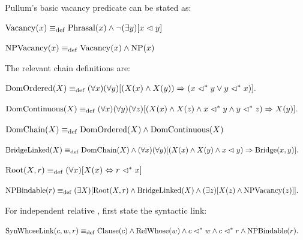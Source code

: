 \documentclass[11pt]{article}
\newcommand{\Vacancy}{\mathrm{Vacancy}}
\newcommand{\NPVac}{\mathrm{NPVacancy}}
\newcommand{\Bridge}{\mathrm{Bridge}}
\newcommand{\DomOrdered}{\mathrm{DomOrdered}}
\newcommand{\DomContinuous}{\mathrm{DomContinuous}}
\newcommand{\DomChain}{\mathrm{DomChain}}
\newcommand{\BridgeLinked}{\mathrm{BridgeLinked}}
\newcommand{\Root}{\mathrm{Root}}
\newcommand{\NPBindable}{\mathrm{NPBindable}}
\newcommand{\RelWhose}{\mathrm{RelWhose}}
\newcommand{\SynWhoseLink}{\mathrm{SynWhoseLink}}
\begin{document}
Pullum's basic vacancy predicate can be stated as:

\ea
$\Vacancy(x) \defas \Phrasal(x) \wedge \neg(\exists y)[x \imdom y]$\\
\z

\ea
$\NPVac(x) \defas \Vacancy(x) \wedge \NP(x)$\\
\z

The relevant chain definitions are:

\ea
$\begin{aligned}
\DomOrdered(X) \defas {} &
  (\forall x)(\forall y)[(X(x) \wedge X(y)) \Rightarrow
    (x \dm y \vee y \dm x)].
\end{aligned}$\\
\z

\ea
$\begin{aligned}
\DomContinuous(X) \defas {} &
  (\forall x)(\forall y)(\forall z)[(X(x) \wedge X(z) \wedge x \dm y
    \wedge y \dm z) \Rightarrow X(y)].
\end{aligned}$\\
\z

\ea
$\DomChain(X) \defas \DomOrdered(X) \wedge \DomContinuous(X)$\\
\z

\ea
$\begin{aligned}
\BridgeLinked(X) \defas {} & \DomChain(X) \wedge
  (\forall x)(\forall y)[(X(x) \wedge X(y) \wedge x \imdom y)
    \Rightarrow \Bridge(x,y)].
\end{aligned}$\\
\z

\ea
$\Root(X,r) \defas (\forall x)[X(x) \Leftrightarrow r \dm x]$\\
\z

\ea
$\begin{aligned}
\NPBindable(r) \defas {} &
  (\exists X)[\Root(X,r) \wedge \BridgeLinked(X) \wedge
    (\exists z)[X(z) \wedge \NPVac(z)]].
\end{aligned}$\\
\z

For independent relative , first state the syntactic link:

\ea
$\begin{aligned}
\SynWhoseLink(c,w,r) \defas {} & \Cl(c) \wedge \RelWhose(w)
  \wedge c \dm w \wedge c \dm r \wedge \NPBindable(r).
\end{aligned}$\\
\z
\end{document}
